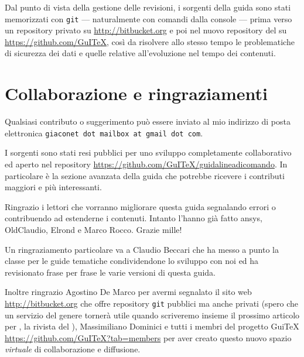 Dal punto di vista della gestione delle revisioni, i sorgenti della guida sono stati memorizzati con \texttt{git} --- naturalmente con comandi dalla console --- prima verso un repository privato su \url{http://bitbucket.org} e poi nel nuovo repository del \GuIT*{} su \url{https://github.com/GuITeX}, così da risolvere allo stesso tempo le problematiche di sicurezza dei dati e quelle relative all'evoluzione nel tempo dei contenuti.

\section{Collaborazione e ringraziamenti}

Qualsiasi contributo o suggerimento può essere inviato al mio indirizzo di posta elettronica \texttt{giaconet dot mailbox at gmail dot com}.

I sorgenti sono stati resi pubblici per uno sviluppo completamente collaborativo ed aperto nel repository \url{https://github.com/GuITeX/guidalineadicomando}. In particolare è la sezione avanzata della guida che potrebbe ricevere i contributi maggiori e più interessanti.

Ringrazio i lettori che vorranno migliorare questa guida segnalando errori o contribuendo ad estenderne i contenuti. Intanto l'hanno già fatto \textsf{ansys}, \textsf{OldClaudio}, \textsf{Elrond} e Marco Rocco. Grazie mille!

Un ringraziamento particolare va a Claudio Beccari che ha messo a punto la classe per le guide tematiche condividendone lo sviluppo con noi ed ha revisionato frase per frase le varie versioni di questa guida.

Inoltre ringrazio Agostino De Marco per avermi segnalato il sito web \url{http://bitbucket.org} che offre repository \texttt{git} pubblici ma anche privati (spero che un servizio del genere tornerà utile quando scriveremo insieme il prossimo articolo per \Ars, la rivista del \GuIT*), Massimiliano Dominici e tutti i membri del progetto GuiTeX  \url{https://github.com/GuITeX?tab=members} per aver creato questo nuovo spazio \emph{virtuale} di collaborazione e diffusione.




